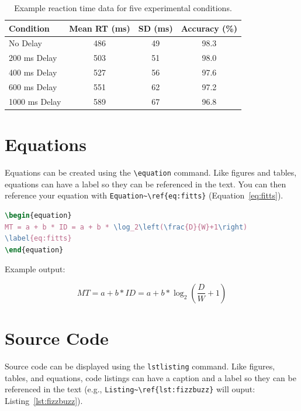 \begin{table}[ht]
\centering
\begin{tabular}{lccc}
\toprule
Condition & Mean RT (ms) & SD (ms) & Accuracy (\%)\\
\midrule
No Delay & 486 & 49 & 98.3\\
200 ms Delay & 503 & 51 & 98.0\\
400 ms Delay & 527 & 56 & 97.6\\
600 ms Delay & 551 & 62 & 97.2\\
1000 ms Delay & 589 & 67 & 96.8\\
\bottomrule
\end{tabular}
\caption{Example reaction time data for five experimental conditions.}
\label{tab:example}
\end{table}



\section{Equations}

Equations can be created using the \texttt{\textbackslash equation} command. Like figures and tables, equations can have a label so they can be referenced in the text. You can then reference your equation with \texttt{Equation\textasciitilde\textbackslash ref\{eq:fitts\}} (Equation~\ref{eq:fitts}).

\begin{lstlisting}[language=TeX,caption={Creating an equation}]
\begin{equation}
MT = a + b * ID = a + b * \log_2\left(\frac{D}{W}+1\right)
\label{eq:fitts}
\end{equation}
\end{lstlisting}

Example output:

\begin{equation}
MT = a + b * ID = a + b * \log_2\left(\frac{D}{W}+1\right)
\label{eq:fitts}
\end{equation}


\section{Source Code}

Source code can be displayed using the \texttt{lstlisting} command. Like figures, tables, and equations, code listings can have a caption and a label so they can be referenced in the text (e.g., \texttt{Listing\textasciitilde\textbackslash ref\{lst:fizzbuzz\}} will ouput: Listing~\ref{lst:fizzbuzz}).

